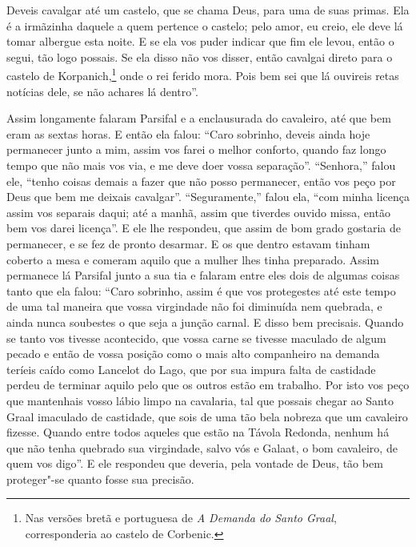 Deveis cavalgar até um castelo, que se chama Deus, para uma de suas primas.
Ela é a irmãzinha daquele a quem pertence o castelo; pelo amor, eu creio, ele
deve lá tomar albergue esta noite. E se ela vos puder indicar que fim ele
levou, então o segui, tão logo possais. Se ela disso não vos disser, então
cavalgai direto para o castelo de Korpanich,\footnote{ Nas versões bretã e
portuguesa de \textit{A Demanda do Santo Graal}, corresponderia ao castelo de
Corbenic.}  onde o rei ferido mora. Pois bem sei que lá ouvireis
retas notícias dele, se não achares lá dentro”. 

 Assim longamente falaram Parsifal e a enclausurada do cavaleiro, até que
bem eram as sextas horas. E então ela falou: “Caro sobrinho, deveis ainda hoje
permanecer junto a mim, assim vos farei o melhor conforto, quando faz longo
tempo que não mais vos via, e me deve doer vossa separação”. “Senhora,'' falou
ele, “tenho coisas demais a fazer que não posso permanecer, então vos peço por
Deus que bem me deixais cavalgar”. “Seguramente,” falou ela, “com minha licença
assim vos separais daqui; até a manhã, assim que tiverdes ouvido missa, então
bem vos darei licença”. E ele lhe respondeu, que assim de bom grado gostaria de
permanecer, e se fez de pronto desarmar. E os que dentro estavam tinham coberto
a mesa e comeram aquilo que a mulher lhes tinha preparado. Assim permanece lá
Parsifal junto a sua tia e falaram entre eles dois de algumas coisas tanto que
ela falou: “Caro sobrinho, assim é que  vos protegestes até este tempo de uma
tal maneira que vossa virgindade não foi diminuída nem quebrada, e ainda nunca
soubestes o que seja a junção carnal. E disso bem precisais. Quando se tanto
vos tivesse acontecido, que vossa carne se tivesse maculado de algum pecado e
então de vossa posição como o mais alto companheiro na demanda teríeis caído
como Lancelot do Lago, que por sua impura falta de castidade perdeu de
terminar aquilo pelo que os outros estão em trabalho. Por isto vos peço que
mantenhais vosso lábio limpo  na cavalaria, tal que
possais chegar ao Santo Graal imaculado de castidade, que sois de uma tão bela
nobreza que um cavaleiro fizesse. Quando entre todos aqueles que estão na
Távola Redonda, nenhum há que não tenha quebrado sua virgindade, salvo vós e
Galaat, o bom cavaleiro, de quem vos digo”. E ele respondeu
que deveria, pela vontade de Deus, tão bem proteger"-se quanto fosse sua
precisão.  

